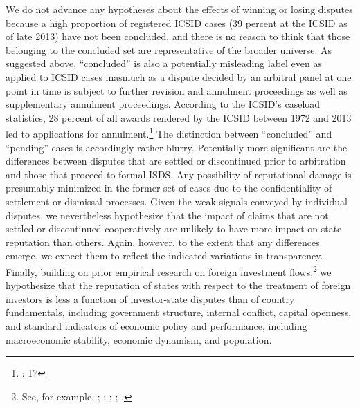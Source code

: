 \documentclass[12pt,onesided]{amsart}
\begin{document}
We do not advance any hypotheses about the effects of winning or losing disputes because a high proportion of registered ICSID cases (39 percent at the ICSID as of late 2013) have not been concluded, and there is no reason to think that those belonging to the concluded set are representative of the broader universe. As suggested above, ``concluded'' is also a potentially misleading label even as applied to ICSID cases inasmuch as a dispute decided by an arbitral panel at one point in time is subject to further revision and annulment proceedings as well as supplementary annulment proceedings. According to the ICSID's caseload statistics, 28 percent of all awards rendered by the ICSID between 1972 and 2013 led to applications for annulment.\footnote{\citet{icsid:2014}: 17} The distinction between ``concluded'' and ``pending'' cases is accordingly rather blurry. Potentially more significant are the differences between disputes that are settled or discontinued prior to arbitration and those that proceed to formal ISDS. Any possibility of reputational damage is presumably minimized in the former set of cases due to the confidentiality of settlement or dismissal processes. Given the weak signals conveyed by individual disputes, we nevertheless hypothesize that the impact of claims that are not settled or discontinued cooperatively are unlikely to have more impact on state reputation than others. Again, however, to the extent that any differences emerge, we expect them to reflect the indicated variations in transparency. Finally, building on prior empirical research on foreign investment flows,\footnote{See, for example, \citet{salacuse:2005}; \citet{buthe:milner:2009}; \citet{neumayer:spess:2005}; \citet{birch:gallagher:2006}; \citet{yackee:2008}.} we hypothesize that the reputation of states with respect to the treatment of foreign investors is less a function of investor-state disputes than of country fundamentals, including government structure, internal conflict, capital openness, and standard indicators of economic policy and performance, including macroeconomic stability, economic dynamism, and population.
\end{document}

